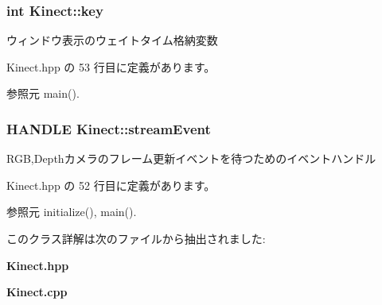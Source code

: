 \subsubsection[{key}]{\setlength{\rightskip}{0pt plus 5cm}int Kinect\-::key}\label{class_kinect_afe9df20df1f2538ac9ce8b61c409095a}


ウィンドウ表示のウェイトタイム格納変数 



 Kinect.\-hpp の 53 行目に定義があります。



参照元 main().

\subsubsection[{stream\-Event}]{\setlength{\rightskip}{0pt plus 5cm}H\-A\-N\-D\-L\-E Kinect\-::stream\-Event}\label{class_kinect_a975c1de77489cffc0728ae9817e127c2}


R\-G\-B,Depthカメラのフレーム更新イベントを待つためのイベントハンドル 



 Kinect.\-hpp の 52 行目に定義があります。



参照元 initialize(), main().



このクラス詳解は次のファイルから抽出されました\-:\begin{DoxyCompactItemize}
\item 
{\bf Kinect.\-hpp}\item 
{\bf Kinect.\-cpp}\end{DoxyCompactItemize}
